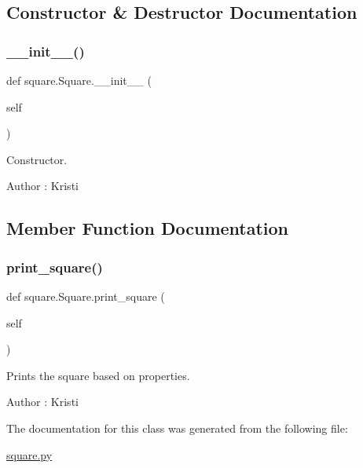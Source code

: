 \subsection{Constructor \& Destructor Documentation}
\mbox{\label{classsquare_1_1_square_a32e445dc381a641dbc1d3136171952d1}} 
\subsubsection{\texorpdfstring{\+\_\+\+\_\+init\+\_\+\+\_\+()}{\_\_init\_\_()}}
{\footnotesize\ttfamily def square.\+Square.\+\_\+\+\_\+init\+\_\+\+\_\+ (\begin{DoxyParamCaption}\item[{}]{self }\end{DoxyParamCaption})}



Constructor. 

\begin{DoxyAuthor}{Author}
\+: Kristi 
\end{DoxyAuthor}


\subsection{Member Function Documentation}
\mbox{\label{classsquare_1_1_square_a5a407995e42599755a899984eedef3f1}} 
\subsubsection{\texorpdfstring{print\+\_\+square()}{print\_square()}}
{\footnotesize\ttfamily def square.\+Square.\+print\+\_\+square (\begin{DoxyParamCaption}\item[{}]{self }\end{DoxyParamCaption})}



Prints the square based on properties. 

\begin{DoxyAuthor}{Author}
\+: Kristi 
\end{DoxyAuthor}


The documentation for this class was generated from the following file\+:\begin{DoxyCompactItemize}
\item 
\mbox{\hyperlink{square_8py}{square.\+py}}\end{DoxyCompactItemize}
